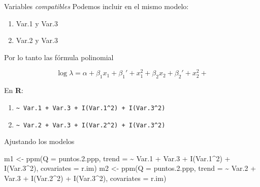\documentclass[
  11pt,
  ignorenonframetext,
]{beamer}
\newenvironment{Shaded}{}{}
\newcommand{\AttributeTok}[1]{\textcolor[rgb]{0.49,0.56,0.16}{#1}}
\newcommand{\DecValTok}[1]{\textcolor[rgb]{0.25,0.63,0.44}{#1}}
\newcommand{\FloatTok}[1]{\textcolor[rgb]{0.25,0.63,0.44}{#1}}
\newcommand{\FunctionTok}[1]{\textcolor[rgb]{0.02,0.16,0.49}{#1}}
\newcommand{\NormalTok}[1]{#1}
\newcommand{\OtherTok}[1]{\textcolor[rgb]{0.00,0.44,0.13}{#1}}
\newcommand{\SpecialCharTok}[1]{\textcolor[rgb]{0.25,0.44,0.63}{#1}}
\providecommand{\tightlist}{%
  \setlength{\itemsep}{0pt}\setlength{\parskip}{0pt}}
\begin{document}
\begin{frame}[fragile]{Variables \emph{compatibles}}
\protect\hypertarget{variables-compatibles}{}
Podemos incluir en el mismo modelo:

\begin{enumerate}
\tightlist
\item
  Var.1 y Var.3
\item
  Var.2 y Var.3
\end{enumerate}

Por lo tanto las fórmula polinomial

\[\log \lambda = \alpha  + \beta_1 x_1 + \beta_1' + x_1^2 + \beta_2 x_2 + \beta_2' + x_2^2 +\]

En \textbf{R}:

\begin{enumerate}
\tightlist
\item
  \texttt{\textasciitilde{}\ Var.1\ +\ Var.3\ +\ I(Var.1\^{}2)\ +\ I(Var.3\^{}2)}
\item
  \texttt{\textasciitilde{}\ Var.2\ +\ Var.3\ +\ I(Var.2\^{}2)\ +\ I(Var.3\^{}2)}
\end{enumerate}
\end{frame}

\begin{frame}[fragile]{Ajustando los modelos}
\protect\hypertarget{ajustando-los-modelos}{}
\begin{Shaded}
\begin{Highlighting}[]
\NormalTok{m1 }\OtherTok{\textless{}{-}} \FunctionTok{ppm}\NormalTok{(}\AttributeTok{Q =}\NormalTok{ puntos.}\FloatTok{2.}\NormalTok{ppp,}
          \AttributeTok{trend =} \SpecialCharTok{\textasciitilde{}}\NormalTok{ Var}\FloatTok{.1} \SpecialCharTok{+}\NormalTok{ Var}\FloatTok{.3} \SpecialCharTok{+} \FunctionTok{I}\NormalTok{(Var}\FloatTok{.1}\SpecialCharTok{\^{}}\DecValTok{2}\NormalTok{) }\SpecialCharTok{+} \FunctionTok{I}\NormalTok{(Var}\FloatTok{.3}\SpecialCharTok{\^{}}\DecValTok{2}\NormalTok{),}
          \AttributeTok{covariates =}\NormalTok{ r.im)}
\NormalTok{m2 }\OtherTok{\textless{}{-}} \FunctionTok{ppm}\NormalTok{(}\AttributeTok{Q =}\NormalTok{ puntos.}\FloatTok{2.}\NormalTok{ppp,}
          \AttributeTok{trend =} \SpecialCharTok{\textasciitilde{}}\NormalTok{ Var}\FloatTok{.2} \SpecialCharTok{+}\NormalTok{ Var}\FloatTok{.3} \SpecialCharTok{+} \FunctionTok{I}\NormalTok{(Var}\FloatTok{.2}\SpecialCharTok{\^{}}\DecValTok{2}\NormalTok{) }\SpecialCharTok{+} \FunctionTok{I}\NormalTok{(Var}\FloatTok{.3}\SpecialCharTok{\^{}}\DecValTok{2}\NormalTok{),}
          \AttributeTok{covariates =}\NormalTok{ r.im)}
\end{Highlighting}
\end{Shaded}
\end{frame}
\end{document}
